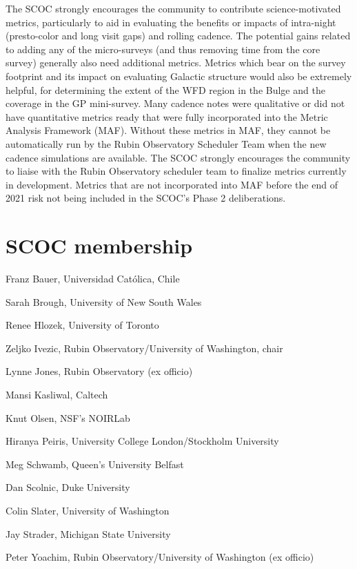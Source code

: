 The SCOC strongly encourages the community to contribute science-motivated metrics, particularly to aid in evaluating the benefits or impacts of intra-night (presto-color and long visit gaps) and rolling cadence. The potential gains related to adding any of the micro-surveys (and thus removing time from the core survey) generally also need additional metrics. Metrics which bear on the survey footprint and its impact on evaluating Galactic structure would also be extremely helpful, for determining the extent of the WFD region in the Bulge and the coverage in the GP mini-survey. Many cadence notes were qualitative or did not have quantitative metrics ready that were fully incorporated into the Metric Analysis Framework (MAF). Without these metrics in MAF, they cannot be automatically run by the Rubin Observatory Scheduler Team when the new cadence simulations are available. The SCOC strongly encourages the community to liaise with the Rubin Observatory scheduler team to finalize metrics currently in development.  Metrics that are not incorporated into MAF before the end of 2021 risk not being included in the SCOC’s Phase 2 deliberations. 

\section{SCOC membership}

 Franz Bauer, Universidad Católica, Chile

 Sarah Brough, University of New South Wales 

 Renee Hlozek, University of Toronto

 Zeljko Ivezic, Rubin Observatory/University of Washington, chair

 Lynne Jones, Rubin Observatory (ex officio)

 Mansi Kasliwal, Caltech 

 Knut Olsen, NSF’s NOIRLab 

 Hiranya Peiris, University College London/Stockholm University

 Meg Schwamb, Queen's University Belfast

 Dan Scolnic, Duke University

 Colin Slater, University of Washington  

 Jay Strader, Michigan State University

 Peter Yoachim, Rubin Observatory/University of Washington (ex officio)

